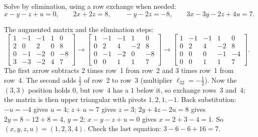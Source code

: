 \begin{exercise}\label{ex:u03-four}
Solve by elimination, using a row exchange when needed:
\[
  x-y-z+u=0,\qquad 2x+2z=8,\qquad -y-2z=-8,\qquad 3x-3y-2z+4u=7 .
\]
\end{exercise}
\begin{solution}
The augmented matrix and the elimination steps:
\[
  \left[\begin{array}{rrrr|r} 1&-1&-1&1&0\\ 2&0&2&0&8\\ 0&-1&-2&0&-8\\ 3&-3&-2&4&7\end{array}\right]
  \to
  \left[\begin{array}{rrrr|r} 1&-1&-1&1&0\\ 0&2&4&-2&8\\ 0&-1&-2&0&-8\\ 0&0&1&1&7\end{array}\right]
  \to
  \left[\begin{array}{rrrr|r} 1&-1&-1&1&0\\ 0&2&4&-2&8\\ 0&0&0&-1&-4\\ 0&0&1&1&7\end{array}\right].
\]
The first arrow subtracts $2$ times row~1 from row~2 and $3$ times row~1 from row~4. The
second adds $\tfrac12$ of row~2 to row~3 (multiplier $\ell_{32}=-\tfrac12$). Now the $(3,3)$
position holds $0$, but row~4 has a $1$ below it, so exchange rows~3 and~4; the matrix is
then upper triangular with pivots $1,2,1,-1$. Back substitution: $-u=-4$ gives $u=4$;
$z+u=7$ gives $z=3$; $2y+4z-2u=8$ gives $2y=8-12+8=4$, $y=2$; $x-y-z+u=0$ gives $x=2+3-4=1$.
So $(x,y,z,u)=(1,2,3,4)$. Check the last equation: $3-6-6+16=7$.
\end{solution}

